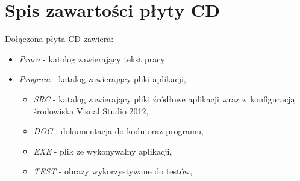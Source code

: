 \chapter{Spis zawartości płyty CD}
\label{cha:zawartoscCD}

Dołączona płyta CD zawiera:
\begin{itemize}
\item \emph{Praca} - katolog zawierający tekst pracy
\item \emph{Program} - katalog zawierający pliki aplikacji,
\begin{itemize}
\item \emph{SRC} - katalog zawierający pliki źródłowe aplikacji wraz z~konfiguracją środowiska Visual Studio 2012,
\item \emph{DOC} - dokumentacja do kodu oraz programu,
\item \emph{EXE} - plik ze wykonywalny aplikacji,
\item \emph{TEST} - obrazy wykorzystywane do testów,
\end{itemize}
\end{itemize}
